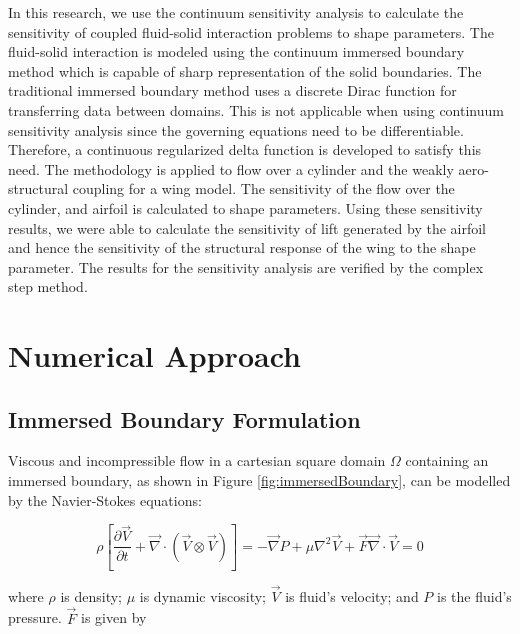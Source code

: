 \documentclass[12pt]{aiaa-pretty}
\begin{document}
In this research, we use the continuum sensitivity analysis to calculate the sensitivity of coupled fluid-solid interaction problems to shape parameters. The fluid-solid interaction is modeled using the continuum immersed boundary method which is capable of sharp representation of the solid boundaries. The traditional immersed boundary method uses a discrete Dirac function for transferring data between domains. This is not applicable when using continuum sensitivity analysis since the governing equations need to be differentiable. Therefore, a continuous regularized delta function is developed to satisfy this need. The methodology is applied to flow over a cylinder and the weakly aero-structural coupling for a wing model. The sensitivity of the flow over the cylinder, and airfoil is calculated to shape parameters. Using these sensitivity results, we were able to calculate the sensitivity of lift generated by the airfoil and hence the sensitivity of the structural response of the wing to the shape parameter. The results for the sensitivity analysis are verified by the complex step method.

\section{Numerical Approach}
\subsection{Immersed Boundary Formulation}
Viscous and incompressible flow in a cartesian square domain $\Omega$ containing an immersed boundary, as shown in Figure \eqref{fig:immersedBoundary}, can be modelled by the Navier-Stokes equations:

%
\begin{subequations}\label{eq:NS}
\begin{equation}
	\rho \left[
	\frac{\partial \vec{V}}{\partial t} + 
	\vec{\nabla} \cdot \left( \vec{V} \otimes \vec{V} \right) 
	\right] = 
	-\vec{\nabla} P + \mu \nabla^2 \vec{V} + \vec{F}
\end{equation}
\begin{equation}
	\vec{\nabla} \cdot \vec{V} = 0
\end{equation}
\end{subequations}
%

where $\rho$ is density; $\mu$ is dynamic viscosity; $\vec{V}$ is fluid's velocity; and $P$ is the fluid's pressure. $\vec{F}$ is given by
\end{document}
